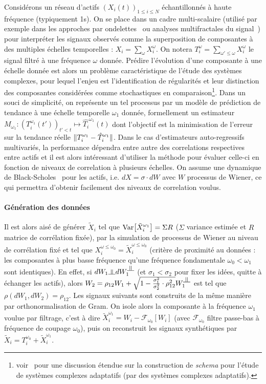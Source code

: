 Considérons un réseau d'actifs $(X_i(t))_{1\leq i \leq N}$ échantillonnés à haute fréquence (typiquement 1s). On se place dans un cadre multi-scalaire (utilisé par exemple dans les approches par ondelettes~\cite{ramsey2002wavelets} ou analyses multifractales du signal~\cite{bouchaud2000apparent}) pour interpréter les signaux observés comme la superposition de composantes à des multiples échelles temporelles : $X_i=\sum_{\omega}{X_i^{\omega}}$. On notera $T_i^{\omega} = \sum_{\omega' \leq \omega} X_i^{\omega}$ le signal filtré à une fréquence $\omega$ donnée. Prédire l'évolution d'une composante à une échelle donnée est alors un problème caractéristique de l'étude des systèmes complexes, pour lequel l'enjeu est l'identification de régularités et leur distinction des composantes considérées comme stochastiques en comparaison\footnote{voir~\cite{gell1995quark} pour une discussion étendue sur la construction de \emph{schema} pour l'étude de systèmes complexes adaptatifs (par des systèmes complexes adaptatifs).}. Dans un souci de simplicité, on représente un tel processus par un modèle de prédiction de tendance à une échelle temporelle $\omega_1$ donnée, formellement un estimateur $M_{\omega_1} : (T_i^{\omega_1}(t'))_{t'<t} \mapsto \hat{T_i}^{\omega_1}(t)$ dont l'objectif est la minimisation de l'erreur sur la tendance réelle $\| T_i^{\omega_1} - \hat{T}_i^{\omega_1} \|$. Dans le cas d'estimateurs auto-regressifs multivariés, la performance dépendra entre autre des correlations respectives entre actifs et il est alors intéressant d'utiliser la méthode pour évaluer celle-ci en fonction de niveaux de correlation à plusieurs échelles. On assume une dynamique de Black-Scholes~\cite{jarrow1999honor} pour les actifs, i.e. $dX = \sigma\cdot dW$ avec $W$ processus de Wiener, ce qui permettra d'obtenir facilement des niveaux de correlation voulus.

\paragraph{Génération des données}

Il est alors aisé de générer $\tilde{X}_i$ tel que $\operatorname{Var}\!\left[\tilde{X}_i^{\omega_1}\right]=\Sigma R$ ($\Sigma$ variance estimée et $R$ matrice de corrélation fixée), par la simulation de processus de Wiener au niveau de corrélation fixé et tel que $X_i^{\omega \leq \omega_0} = \tilde{X}_i^{\omega \leq \omega_0}$ (critère de proximité au données : les composantes à plus basse fréquence qu'une fréquence fondamentale $\omega_0 < \omega_1$ sont identiques). En effet, si $dW_1 \indep dW_1^{\indep}$ (et $\sigma_1 < \sigma_2$ pour fixer les idées, quitte à échanger les actifs), alors $W_2 = \rho_{12}W_1 + \sqrt{1-\frac{\sigma_1^2}{\sigma_2^2}\cdot\rho_{12}^2}W_1^{\indep}$ est tel que $\rho(dW_1,dW_2)=\rho_{12}$. Les signaux suivants sont construits de la même manière par orthonormalisation de Gram. On isole alors la composante à la fréquence $\omega_1$ voulue par filtrage, c'est à dire $\tilde{X}_i^{\omega_1} = W_i - \mathcal{F}_{\omega_0}[W_i]$ (avec $\mathcal{F}_{\omega_0}$ filtre passe-bas à fréquence de coupage $\omega_0$), puis on reconstruit les signaux synthétiques par $\tilde{X}_i = T_i^{\omega_0} + \tilde{X}_i^{\omega_1}$.



